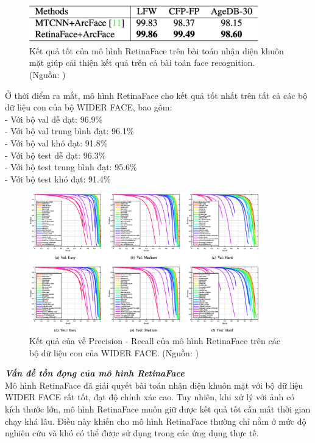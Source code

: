 {    \begin{figure}[H]
        \centering
        \includegraphics[width=10cm] {images/retinaface_results_2}
        \caption{Kết quả tốt của mô hình RetinaFace trên bài toán nhận diện khuôn mặt giúp cải thiện kết quả trên cả bài toán face recognition. (Nguồn: \cite{deng2020retinaface})}
        \label{fig:retinaface_results_2}
    \end{figure}

    \noindent
    Ở thời điểm ra mắt, mô hình RetinaFace cho kết quả tốt nhất trên tất cả các bộ dữ liệu con của bộ WIDER FACE, bao gồm: \\
    - Với bộ val dễ đạt: 96.9\% \\
    - Với bộ val trung bình đạt: 96.1\% \\
    - Với bộ val khó đạt: 91.8\% \\
    - Với bộ test dễ đạt: 96.3\% \\
    - Với bộ test trung bình đạt: 95.6\% \\
    - Với bộ test khó đạt: 91.4\%

    \begin{figure}[H]
        \centering
        \includegraphics[width=10cm] {images/retinaface_results_3}
        \caption{Kết quả của về Precision - Recall của mô hình RetinaFace trên các bộ dữ liệu con của WIDER FACE. (Nguồn: \cite{deng2020retinaface})}
        \label{fig:retinaface_results_3}
    \end{figure}

    \noindent
    \textbf{\textit{Vấn đề tồn đọng của mô hình RetinaFace}} \\
    Mô hình RetinaFace đã giải quyết bài toán nhận diện khuôn mặt với bộ dữ liệu WIDER FACE rất tốt, đạt độ chính xác cao.
    Tuy nhiên, khi xử lý với ảnh có kích thước lớn, mô hình RetinaFace muốn giữ được kết quả tốt cần mất thời gian chạy khá lâu.
    Điều này khiến cho mô hình RetinaFace thường chỉ nằm ở mức độ nghiên cứu và khó có thể được sử dụng trong các ứng dụng thực tế.
}